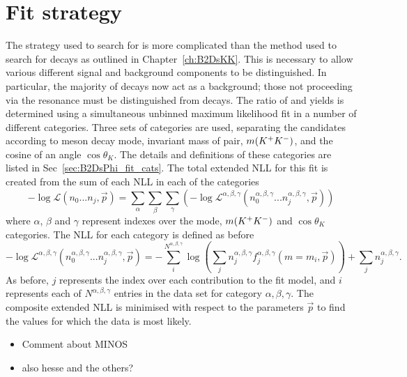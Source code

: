 \section{Fit strategy}
\label{sec:B2DsPhi_fitstrategy}
The strategy used to search for \decay{\Bp}{\Dsp\phiz} is more complicated than the method used to search for \decay{\Bp}{\Dsp\Kp\Km} decays as outlined in Chapter~\ref{ch:B2DsKK}. This is necessary to allow various different signal and background components to be distinguished. In particular, the majority of \decay{\Bp}{\Dsp\Kp\Km} decays now act as a background; those not proceeding via the \phiz resonance must be distinguished from \decay{\Bp}{\Dsp\phiz} decays. 
The ratio of \decay{\Bp}{\Dsp\phiz} and \decay{\Bp}{\Dsp\Dzb} yields is determined using a simultaneous unbinned maximum likelihood fit in a number of different categories. Three sets of categories are used, separating the candidates according to \Dsp meson decay mode, invariant mass of \Kp\Km pair, $m({{K}^+}{{K}^-})$, and the cosine of an angle $\cos\theta_{K}$. The details and definitions of these categories are listed in Sec~\ref{sec:B2DsPhi_fit_cats}. 
The total extended NLL for this fit is created from the sum of each NLL in each of the categories
\begin{equation}
-\log\mathcal{L}(n_{0}...n_{j},\vec{p}) = \sum_{\alpha} \sum_{\beta} \sum_{\gamma} \left(-\log\mathcal{L^{\alpha,\beta,\gamma}}(n_{0}^{\alpha,\beta,\gamma}...n_{j}^{\alpha,\beta,\gamma},\vec{p}) \right)
\end{equation} 
where $\alpha$, $\beta$ and $\gamma$ represent indexes over the \Dsp mode, $m({{K}^+}{{K}^-})$ and $\cos\theta_{K}$ categories.
The NLL for each category is defined as before
\begin{equation}
-\log\mathcal{L^{\alpha,\beta,\gamma}}(n_{0}^{\alpha,\beta,\gamma}...n_{j}^{\alpha,\beta,\gamma},\vec{p}) = -\sum_{i}^{N^{\alpha,\beta,\gamma}} \log \left( \sum_{j} n_{j}^{\alpha,\beta,\gamma} f_{j}^{\alpha,\beta,\gamma}(m=m_{i},\vec{p}) \right) + \sum_{j}n_{j}^{\alpha,\beta,\gamma}.
\end{equation} 
As before, $j$ represents the index over each contribution to the fit model, and $i$ represents each of $N^{\alpha,\beta,\gamma}$ entries in the data set for category $\alpha,\beta,\gamma$. 
The composite extended NLL is minimised with respect to the parameters $\vec{p}$ to find the values for which the data is most likely.
{\color{Red}
\begin{itemize}
\item Comment about MINOS
\item also hesse and the others?
\end{itemize}
}

